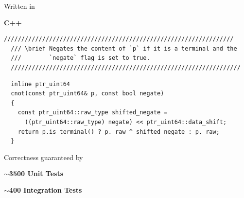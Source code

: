 \documentclass[english, aspectratio=169]{beamer}
\begin{document}
\begin{frame}
  \begin{figure}
    \centering

    \begin{tikzpicture}
      
    \end{tikzpicture}
  \end{figure}
\end{frame}

\begin{frame}
  \begin{center}
    {\LARGE Written in}

    \medskip

    {\fontsize{42}{50}\selectfont \textbf{C++}}
  \end{center}
\end{frame}

\begin{frame}
  \begin{lstlisting}[numbers=none]
  //////////////////////////////////////////////////////////////////
  /// \brief Negates the content of `p` if it is a terminal and the
  ///        `negate` flag is set to true.
  //////////////////////////////////////////////////////////////////
  \end{lstlisting}
  \begin{lstlisting}
  inline ptr_uint64
  cnot(const ptr_uint64& p, const bool negate)
  {
    const ptr_uint64::raw_type shifted_negate =
      ((ptr_uint64::raw_type) negate) << ptr_uint64::data_shift;
    return p.is_terminal() ? p._raw ^ shifted_negate : p._raw;
  }
  \end{lstlisting}
\end{frame}

\begin{frame}
  \begin{center}
    {\LARGE Correctness guaranteed by}

    {\Huge
      \textbf{$\sim$3500 Unit Tests}

      \bigskip

      \textbf{$\sim$400 Integration Tests}
    }
  \end{center}
\end{frame}

\blankframe
\end{document}
